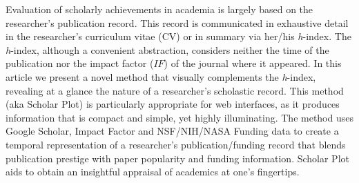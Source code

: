 Evaluation of scholarly achievements in academia is largely based on the researcher's publication record. This record is communicated in exhaustive detail in the researcher's curriculum vitae (CV) or in summary via her/his {\it h}-index. The {\it h}-index, although a convenient abstraction, considers neither the time of the publication nor the impact factor ($IF$) of the journal where it appeared. In this article we present a novel method that visually complements the {\it h}-index, revealing at a glance the nature of a researcher's scholastic record. This method (aka Scholar Plot) is particularly appropriate for web interfaces, as it produces information that is compact and simple, yet highly illuminating. The method uses Google Scholar, Impact Factor and NSF/NIH/NASA Funding data to create a temporal representation of a researcher's publication/funding record that blends publication prestige with paper popularity and funding information. Scholar Plot aids to obtain an insightful appraisal of academics at one's fingertips.



